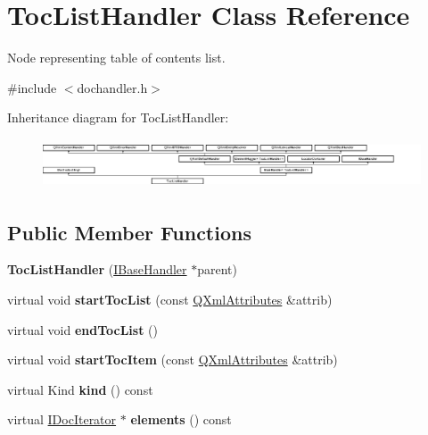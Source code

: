 \hypertarget{class_toc_list_handler}{}\section{Toc\+List\+Handler Class Reference}
\label{class_toc_list_handler}


Node representing table of contents list.  




{\ttfamily \#include $<$dochandler.\+h$>$}

Inheritance diagram for Toc\+List\+Handler\+:\begin{figure}[H]
\begin{center}
\leavevmode
\includegraphics[height=1.474654cm]{class_toc_list_handler}
\end{center}
\end{figure}
\subsection*{Public Member Functions}
\begin{DoxyCompactItemize}
\item 
\mbox{\label{class_toc_list_handler_a01297aa2307db2980356c78861d851b9}} 
{\bfseries Toc\+List\+Handler} (\mbox{\hyperlink{class_i_base_handler}{I\+Base\+Handler}} $\ast$parent)
\item 
\mbox{\label{class_toc_list_handler_af2e57f82f520955b2c883462978c8f41}} 
virtual void {\bfseries start\+Toc\+List} (const \mbox{\hyperlink{class_q_xml_attributes}{Q\+Xml\+Attributes}} \&attrib)
\item 
\mbox{\label{class_toc_list_handler_add767203f15a6d91adab55044cfef42c}} 
virtual void {\bfseries end\+Toc\+List} ()
\item 
\mbox{\label{class_toc_list_handler_a3a7201f53e8e9e8ee81baf26a3384f63}} 
virtual void {\bfseries start\+Toc\+Item} (const \mbox{\hyperlink{class_q_xml_attributes}{Q\+Xml\+Attributes}} \&attrib)
\item 
\mbox{\label{class_toc_list_handler_ac33fe75825925e4d5860141aa8b6d293}} 
virtual Kind {\bfseries kind} () const
\item 
\mbox{\label{class_toc_list_handler_a03a689244bdd770e259a857a980da059}} 
virtual \mbox{\hyperlink{class_i_doc_iterator}{I\+Doc\+Iterator}} $\ast$ {\bfseries elements} () const
\end{DoxyCompactItemize}
